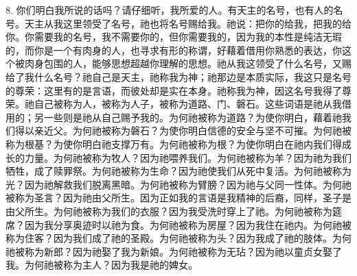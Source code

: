 8. 你们明白我所说的话吗？请仔细听，我所爱的人。有天主的名号，也有人的名号。\newline{}天主从我这里领受了名号，祂也将名号赐给我。祂说：把你的给我，把我的给你。你需要我的名号，我不需要你的，但你需要我的，因为我的本性是纯洁无瑕的，而你是一个有肉身的人，也寻求有形的称谓，好藉着借用你熟悉的表达，你这个被肉身包围的人，能够思想超越你理解的思想。\newline{}祂从我这领受了什么名号，又赐给了我什么名号？祂自己是天主，祂称我为神；祂那边是本质实际，我这只是名号的尊荣：\newline{}这里有的是言语，而彼处却是实在本身。祂称我为神，因这名号我得了尊荣。祂自己被称为人，被称为人子，被称为道路、门、磐石。这些词语是祂从我借用的；另一些则是祂从自己赐予我的。\newline{}为何祂被称为道路？为使你明白，藉着祂我们得以亲近父。\newline{}为何祂被称为磐石？为使你明白信德的安全与坚不可摧。\newline{}为何祂被称为根基？为使你明白祂支撑万有。\newline{}为何祂被称为根？为使你明白在祂内我们得成长的力量。\newline{}为何祂被称为牧人？因为祂喂养我们。\newline{}为何祂被称为羊？因为祂为我们牺牲，成了赎罪祭。\newline{}为何祂被称为生命？因为祂使我们从死中复活。\newline{}为何祂被称为光？因为祂解救我们脱离黑暗。\newline{}为何祂被称为臂膀？因为祂与父同一性体。\newline{}为何祂被称为圣言？因为祂由父所生。\newline{}因为正如我的言语是我精神的后裔，同样，圣子是由父所生。\newline{}为何祂被称为我们的衣服？因为我受洗时穿上了祂。\newline{}为何祂被称为筵席？因为我分享奥迹时以祂为食。\newline{}为何祂被称为房屋？因为我住在祂内。\newline{}为何祂被称为住客？因为我们成了祂的圣殿。\newline{}为何祂被称为头？因为我成了祂的肢体。\newline{}为何祂被称为新郎？因为祂娶了我为新娘。\newline{}为何祂被称为无玷？因为祂以童贞女娶了我。\newline{}为何祂被称为主人？因为我是祂的婢女。\par

